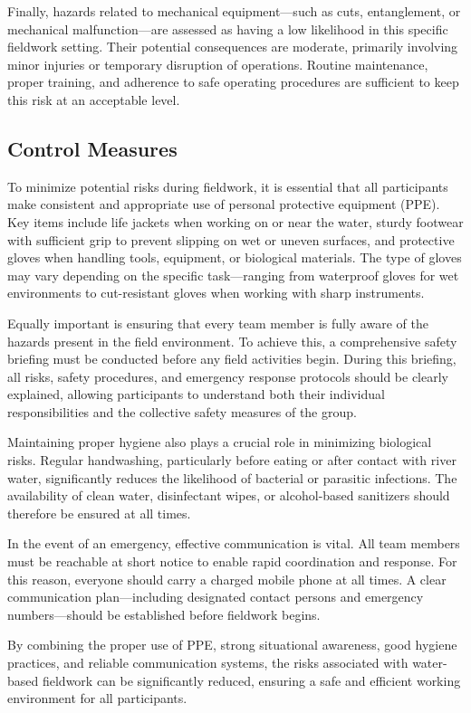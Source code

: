 Finally, hazards related to mechanical equipment—such as cuts, entanglement, or mechanical malfunction—are assessed as having a low likelihood in this specific fieldwork setting. Their potential consequences are moderate, primarily involving minor injuries or temporary disruption of operations. Routine maintenance, proper training, and adherence to safe operating procedures are sufficient to keep this risk at an acceptable level.


\subsection{Control Measures}
To minimize potential risks during fieldwork, it is essential that all participants make consistent and appropriate use of personal protective equipment (PPE). Key items include life jackets when working on or near the water, sturdy footwear with sufficient grip to prevent slipping on wet or uneven surfaces, and protective gloves when handling tools, equipment, or biological materials. The type of gloves may vary depending on the specific task—ranging from waterproof gloves for wet environments to cut-resistant gloves when working with sharp instruments.

Equally important is ensuring that every team member is fully aware of the hazards present in the field environment. To achieve this, a comprehensive safety briefing must be conducted before any field activities begin. During this briefing, all risks, safety procedures, and emergency response protocols should be clearly explained, allowing participants to understand both their individual responsibilities and the collective safety measures of the group.

Maintaining proper hygiene also plays a crucial role in minimizing biological risks. Regular handwashing, particularly before eating or after contact with river water, significantly reduces the likelihood of bacterial or parasitic infections. The availability of clean water, disinfectant wipes, or alcohol-based sanitizers should therefore be ensured at all times.

In the event of an emergency, effective communication is vital. All team members must be reachable at short notice to enable rapid coordination and response. For this reason, everyone should carry a charged mobile phone at all times. A clear communication plan—including designated contact persons and emergency numbers—should be established before fieldwork begins.

By combining the proper use of PPE, strong situational awareness, good hygiene practices, and reliable communication systems, the risks associated with water-based fieldwork can be significantly reduced, ensuring a safe and efficient working environment for all participants.